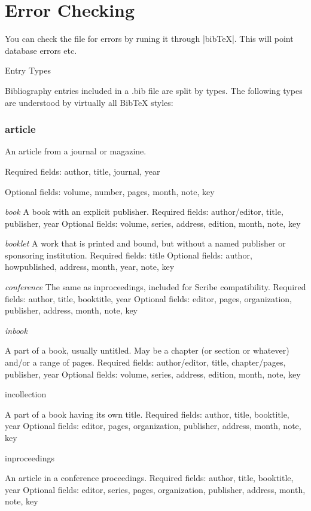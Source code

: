 \section{Error Checking}

You can check the file for errors by runing it through |bibTeX|. This will point database errors etc. 


Entry Types

Bibliography entries included in a .bib file are split by types. The following types are understood by virtually all BibTeX styles:

\subsubsection*{article}
  An article from a journal or magazine.

  Required fields: author, title, journal, year

  Optional fields: volume, number, pages, month, note, key

\emph{book}
   A book with an explicit publisher.
   Required fields: author/editor, title, publisher, year
   Optional fields: volume, series, address, edition, month, note, key

\emph{booklet}
   A work that is printed and bound, but without a named publisher or sponsoring institution.
   Required fields: title
   Optional fields: author, howpublished, address, month, year, note, key

\emph{conference}
   The same as inproceedings, included for Scribe compatibility.
   Required fields: author, title, booktitle, year
   Optional fields: editor, pages, organization, publisher, address, month, note, key

\emph{inbook}

    A part of a book, usually untitled. May be a chapter (or section or whatever) and/or a range of pages.
    Required fields: author/editor, title, chapter/pages, publisher, year
    Optional fields: volume, series, address, edition, month, note, key

incollection

    A part of a book having its own title.
    Required fields: author, title, booktitle, year
    Optional fields: editor, pages, organization, publisher, address, month, note, key

inproceedings

An article in a conference proceedings.
Required fields: author, title, booktitle, year
Optional fields: editor, series, pages, organization, publisher, address, month, note, key

